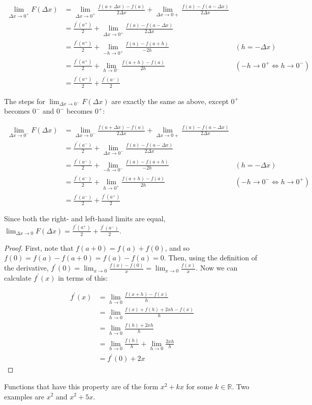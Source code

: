 \begin{align*}
  \lim_{\Delta x \rightarrow 0^+} F(\Delta x) &= \lim_{\Delta x \rightarrow 0^+} \frac{f(a + \Delta x) - f(a)}{2\Delta x} + \lim_{\Delta x \rightarrow 0+} \frac{f(a) - f(a - \Delta x)}{2\Delta x} \\
  &= \frac{f^{\prime}(a^+)}{2} + \lim_{\Delta x \rightarrow 0^+} \frac{f(a) - f(a - \Delta x)}{2\Delta x} \\
  &= \frac{f^{\prime}(a^+)}{2} + \lim_{-h \rightarrow 0^+} \frac{f(a) - f(a + h)}{-2h} & (h = -\Delta x) \\
  &= \frac{f^{\prime}(a^+)}{2} + \lim_{h \rightarrow 0^-} \frac{f(a + h) - f(a)}{2h} & (-h \rightarrow 0^+ \iff h \rightarrow 0^-) \\
  &= \frac{f^{\prime}(a^+)}{2} + \frac{f^{\prime}(a^-)}{2}
\end{align*}

The steps for $\lim_{\Delta x \rightarrow 0^-} F(\Delta x)$ are exactly the same as above, except $0^+$ becomes $0^-$ and $0^-$ becomes $0^+$:

\begin{align*}
  \lim_{\Delta x \rightarrow 0^-} F(\Delta x) &= \lim_{\Delta x \rightarrow 0^-} \frac{f(a + \Delta x) - f(a)}{2\Delta x} + \lim_{\Delta x \rightarrow 0+} \frac{f(a) - f(a - \Delta x)}{2\Delta x} \\
  &= \frac{f^{\prime}(a^-)}{2} + \lim_{\Delta x \rightarrow 0^-} \frac{f(a) - f(a - \Delta x)}{2\Delta x} \\
  &= \frac{f^{\prime}(a^-)}{2} + \lim_{-h \rightarrow 0^-} \frac{f(a) - f(a + h)}{-2h} & (h = -\Delta x) \\
  &= \frac{f^{\prime}(a^-)}{2} + \lim_{h \rightarrow 0^+} \frac{f(a + h) - f(a)}{2h} & (-h \rightarrow 0^- \iff h \rightarrow 0^+) \\
  &= \frac{f^{\prime}(a^-)}{2} + \frac{f^{\prime}(a^+)}{2}
\end{align*}

Since both the right- and left-hand limits are equal, $\lim_{\Delta x \rightarrow 0} F(\Delta x) = \frac{f^{\prime}(a^+)}{2} + \frac{f^{\prime}(a^-)}{2}$.

\begin{proof}
  First, note that $f(a + 0) = f(a) + f(0)$, and so $f(0) = f(a) - f(a + 0) = f(a) - f(a) = 0$. Then, using the definition of the derivative, $f^{\prime}(0) = \lim_{x \rightarrow 0} \frac{f(x) - f(0)}{x} = \lim_{x \rightarrow 0} \frac{f(x)}{x}$. Now we can calculate $f^{\prime}(x)$ in terms of this:

  \begin{align*}
    f^{\prime}(x) &= \lim_{h \rightarrow 0} \frac{f(x + h) - f(x)}{h} \\
    &= \lim_{h \rightarrow 0} \frac{f(x) + f(h) + 2xh - f(x)}{h} \\
    &= \lim_{h \rightarrow 0} \frac{f(h) + 2xh}{h} \\
    &= \lim_{h \rightarrow 0} \frac{f(h)}{h} + \lim_{h \rightarrow 0} \frac{2xh}{h} \\
    &= f^{\prime}(0) + 2x
  \end{align*}
\end{proof}

Functions that have this property are of the form $x^2 + kx$ for some $k \in \mathbb{R}$. Two examples are $x^2$ and $x^2 + 5x$.



